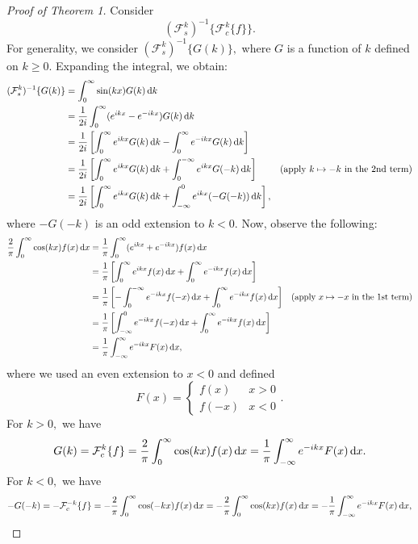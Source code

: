 \documentclass[10pt,reqno,oneside,a4paper, landscape]{article}
\begin{document}
\begin{proof}[Proof of Theorem 1]
Consider
\[ 
(\mathcal{F}^k_s)^{-1} \{ \mathcal{F}^k_c \{ f \} \}.
\]
For generality, we consider $(\mathcal{F}^k_s)^{-1} \{ G(k) \},$ where $G$ is a function of $k$ defined on $k\geq 0.$ Expanding the integral, we obtain:
\begin{align*}
(\mathcal{F}^k_s)^{-1} \{ G(k) \} &= \int^{\infty}_0 \sin(kx) G(k) \,\mathrm{d} k \\
&= \frac{1}{2i} \int^{\infty}_0 (e^{ikx} - e^{-ikx}) G(k) \,\mathrm{d} k \\
&= \frac{1}{2i} \left[ \int^{\infty}_0 e^{ikx} G(k) \,\mathrm{d} k - \int^{\infty}_0 e^{-ikx} G(k) \,\mathrm{d} k\right] \\
&= \frac{1}{2i} \left[ \int^{\infty}_0 e^{ikx} G(k) \,\mathrm{d} k + \int^{-\infty}_0 e^{ikx} G(-k) \,\mathrm{d} k\right] &\text{(apply $k \mapsto - k$ in the 2nd term)} \\
&= \frac{1}{2i} \left[ \int^{\infty}_0 e^{ikx} G(k) \,\mathrm{d} k + \int_{-\infty}^0 e^{ikx} (-G(-k)) \,\mathrm{d} k\right],
\end{align*}
where $-G(-k)$ is an odd extension to $k<0$. Now, observe the following:
\begin{align*}
\frac{2}{\pi} \int^{\infty}_0 \cos(kx) f(x) \,\mathrm{d} x &=\frac{1}{\pi} \int^{\infty}_0 (e^{ikx} + e^{-ikx}) f(x) \,\mathrm{d} x \\
&= \frac{1}{\pi} \left[ \int^{\infty}_0 e^{ikx} f(x) \,\mathrm{d} x + \int^{\infty}_0 e^{-ikx} f(x) \,\mathrm{d} x \right] \\
&= \frac{1}{\pi} \left[ -\int^{-\infty}_0 e^{-ikx} f(-x) \,\mathrm{d} x  + \int^{\infty}_0 e^{-ikx} f(x) \,\mathrm{d} x  \right] &\text{(apply $x \mapsto - x$ in the 1st term)} \\
&= \frac{1}{\pi} \left[ \int_{-\infty}^0 e^{-ikx} f(-x) \,\mathrm{d} x  + \int^{\infty}_0 e^{-ikx} f(x) \,\mathrm{d} x \right] \\
&= \frac{1}{\pi} \int_{-\infty}^\infty e^{-ikx} F(x) \,\mathrm{d} x, 
\end{align*}
where we used an even extension to $x<0$ and defined
\[ 
F(x) = \begin{cases} f(x) & x>0 \\ f(-x) & x<0 \end{cases}.
\]
For $k>0,$ we have
\begin{equation}\label{G(k)}
G(k) = \mathcal{F}^k_c \{ f \} = \frac{2}{\pi} \int^{\infty}_0 \cos(kx) f(x) \,\mathrm{d} x = \frac{1}{\pi} \int_{-\infty}^\infty e^{-ikx} F(x) \,\mathrm{d} x.
\end{equation}
For $k<0,$ we have 
\begin{equation}\label{-G(-k)}
-G(- k) = - \mathcal{F}^{-k}_c \{ f \}  = -\frac{2}{\pi} \int^{\infty}_0 \cos(-kx) f(x) \D x =-\frac{2}{\pi} \int^{\infty}_0 \cos(kx) f(x) \D x = - \frac{1}{\pi} \int_{-\infty}^\infty e^{-ikx} F(x) \D x, 

\end{equation}
\end{proof}
\end{document}
